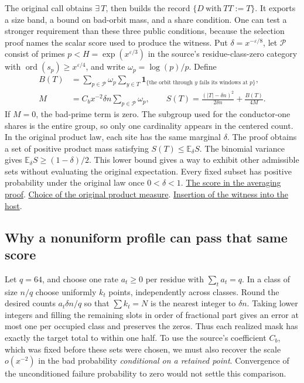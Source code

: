 \documentclass[12pt,letterpaper]{article}
\begin{document}
The original call obtains \(\exists\,T\), then builds the record \(\{D\ \mathrm{with}\ TT:=T\}\). It exports a size band, a bound on bad-orbit mass, and a share condition. One can test a stronger requirement than these three public conditions, because the selection proof names the scalar score used to produce the witness. Put \(\delta=x^{-\varepsilon/8}\), let \(\mathcal P\) consist of primes \(p< H=\exp(x^{\varepsilon/3})\) in the source's residue-class-zero category with \(\operatorname{ord}(s_p)\ge x^{\varepsilon/4}\), and write \(\omega_p=\log(p)/p\). Define
\begin{align*}
 B(T)&=\sum_{p\in\mathcal P}\omega_p
   \sum_{y\in T}\mathbf 1_{\{\text{the orbit through }y\text{ fails its windows at }p\}},\\
 M&=C_bx^{-2}\delta n\sum_{p\in\mathcal P}\omega_p,\qquad
 S(T)=\frac{(|T|-\delta n)^2}{2\delta n}+\frac{B(T)}{4M}.
\end{align*}
If \(M=0\), the bad-prime term is zero. The subgroup used for the conductor-one shares is the entire group, so only one cardinality appears in the centered count. In the original product law, each site has the same marginal \(\delta\). The proof obtains a set of positive product mass satisfying \(S(T)\le\mathbb E_\delta S\). The binomial variance gives \(\mathbb E_\delta S\ge(1-\delta)/2\). This lower bound gives a way to exhibit other admissible sets without evaluating the original expectation. Every fixed subset has positive probability under the original law once \(0<\delta<1\).
\href{https://github.com/nousentllc/riemann-hypothesis/blob/40e56bab026552e089d7afcfeff08d2defb9c005/src/Development/AutomorphicArithmetic/ThickFrames/select.lean#L136-L173}{The score in the averaging proof}.
\href{https://github.com/nousentllc/riemann-hypothesis/blob/40e56bab026552e089d7afcfeff08d2defb9c005/src/Development/AutomorphicArithmetic/ThickFrames/topsGroup.lean#L88-L123}{Choice of the original product measure}.
\href{https://github.com/nousentllc/riemann-hypothesis/blob/40e56bab026552e089d7afcfeff08d2defb9c005/src/Development/AutomorphicArithmetic/ShortNorms/hostOfFieldOf.lean#L217-L229}{Insertion of the witness into the host}.

\subsection{Why a nonuniform profile can pass that same score}

Let \(q=64\), and choose one rate \(a_t\ge0\) per residue with \(\sum_t a_t=q\). In a class of size \(n/q\) choose uniformly \(k_t\) points, independently across classes. Round the desired counts \(a_t\delta n/q\) so that \(\sum k_t=N\) is the nearest integer to \(\delta n\). Taking lower integers and filling the remaining slots in order of fractional part gives an error at most one per occupied class and preserves the zeros. Thus each realized mask has exactly the target total to within one half. To use the source's coefficient \(C_b\), which was fixed before these sets were chosen, we must also recover the scale \(o(x^{-2})\) in the bad probability \emph{conditional on a retained point}. Convergence of the unconditioned failure probability to zero would not settle this comparison.
\end{document}

